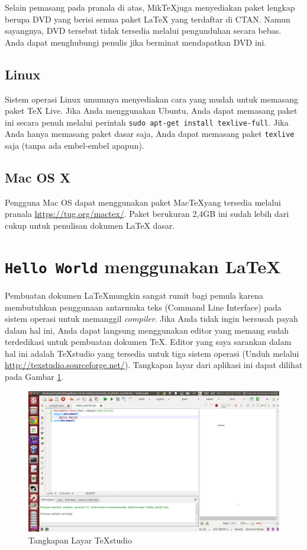 \documentclass{ta-its}
\begin{document}
        
        Selain pemasang pada pranala di atas, Mik\TeX juga menyediakan paket lengkap berupa DVD yang berisi semua paket LaTeX yang terdaftar di CTAN. Namun sayangnya, DVD tersebut tidak tersedia melalui pengunduhan secara bebas. Anda dapat menghubungi penulis jika berminat mendapatkan DVD ini.
        
        
        \subsection{Linux}
        
        Sistem operasi Linux umumnya menyediakan cara yang mudah untuk memasang paket \TeX{} Live. Jika Anda menggunakan Ubuntu, Anda dapat memasang paket ini secara penuh melalui perintah \texttt{sudo apt-get install texlive-full}. Jika Anda hanya memasang paket dasar saja, Anda dapat memasang paket \texttt{texlive} saja (tanpa ada embel-embel apapun).
        
        \subsection{Mac OS X}
        Pengguna Mac OS dapat menggunakan paket Mac\TeX yang tersedia melalui pranala \url{https://tug.org/mactex/}. Paket berukuran 2,4GB ini sudah lebih dari cukup untuk penulisan dokumen La\TeX{} dasar.
        
        
        \section{\texttt{Hello World} menggunakan \LaTeX{}}
        Pembuatan dokumen La\TeX mungkin sangat rumit bagi pemula karena membutuhkan penggunaan antarmuka teks (Command Line Interface) pada sistem operasi untuk memanggil \emph{compiler}. Jika Anda tidak ingin bersusah payah dalam hal ini, Anda dapat langsung menggunakan editor yang memang sudah terdedikasi untuk pembuatan dokumen \TeX{}. Editor yang saya sarankan dalam hal ini adalah \TeX{}studio yang tersedia untuk tiga sistem operasi (Unduh melalui \url{http://texstudio.sourceforge.net/}). Tangkapan layar dari aplikasi ini dapat dilihat pada Gambar \ref{gambarTexStudio}.
        
        \begin{figure}[h] %
			\centering
			\includegraphics[width=\linewidth]{contoh_img/texstudio}
			\caption{Tangkapan Layar \TeX{}studio}
			\label{gambarTexStudio}
		\end{figure}
\end{document}
